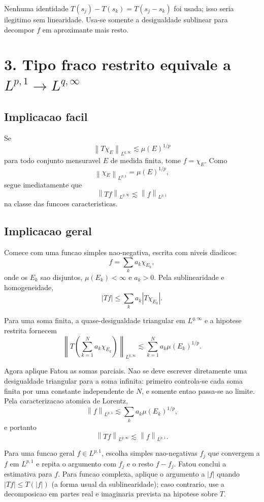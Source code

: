 \documentclass[12pt,a4paper]{article}
\newcommand{\norm}[2]{\left\|#1\right\|_{#2}}
\begin{document}
Nenhuma identidade $T(s_j)-T(s_k)=T(s_j-s_k)$ foi usada; isso seria ilegitimo
sem linearidade. Usa-se somente a desigualdade sublinear para decompor $f$ em
aproximante mais resto.

\section*{3. Tipo fraco restrito equivale a $L^{p,1}\to L^{q,\infty}$}

\subsection*{Implicacao facil}

Se
\[
\norm{T\chi_E}{L^{q,\infty}}\lesssim\mu(E)^{1/p}
\]
para todo conjunto mensuravel $E$ de medida finita, tome $f=\chi_E$. Como
\[
\norm{\chi_E}{L^{p,1}}=\mu(E)^{1/p},
\]
segue imediatamente que
\[
\norm{Tf}{L^{q,\infty}}\lesssim\norm{f}{L^{p,1}}
\]
na classe das funcoes caracteristicas.

\subsection*{Implicacao geral}

Comece com uma funcao simples nao-negativa, escrita com niveis diadicos:
\[
f=\sum_ka_k\chi_{E_k},
\]
onde os $E_k$ sao disjuntos, $\mu(E_k)<\infty$ e $a_k>0$. Pela sublinearidade
e homogeneidade,
\[
|Tf|\leq\sum_ka_k|T\chi_{E_k}|.
\]

Para uma soma finita, a quase-desigualdade triangular em $L^{q,\infty}$ e a
hipotese restrita fornecem
\[
\norm{T(\sum_{k=1}^Na_k\chi_{E_k})}{L^{q,\infty}}
\lesssim\sum_{k=1}^Na_k\mu(E_k)^{1/p}.
\]

Agora aplique Fatou as somas parciais. Nao se deve escrever diretamente uma
desigualdade triangular para a soma infinita: primeiro controla-se cada soma
finita por uma constante independente de $N$, e somente entao passa-se ao
limite. Pela caracterizacao atomica de Lorentz,
\[
\norm{f}{L^{p,1}}\lesssim\sum_ka_k\mu(E_k)^{1/p},
\]
e portanto
\[
\norm{Tf}{L^{q,\infty}}\lesssim\norm{f}{L^{p,1}}.
\]

Para uma funcao geral $f\in L^{p,1}$, escolha simples nao-negativas $f_j$ que
convergem a $f$ em $L^{p,1}$ e repita o argumento com $f_j$ e o resto $f-f_j$. 
Fatou conclui a estimativa para $f$. Para funcao complexa, aplique o argumento
a $|f|$ quando $|Tf|\leq T(|f|)$ (a forma usual da sublinearidade); caso
contrario, use a decomposicao em partes real e imaginaria prevista na hipotese
sobre $T$.
\end{document}

